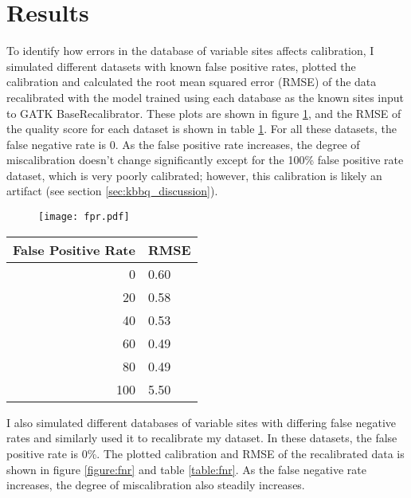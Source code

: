 \section{Results}
To identify how errors in the database of variable sites affects calibration, I simulated different datasets with known false positive rates, plotted the calibration and calculated the root mean squared error (RMSE) of the data recalibrated with the model trained using each database as the known sites input to GATK BaseRecalibrator. These plots are shown in figure \ref{figure:fpr}, and the RMSE of the quality score for each dataset is shown in table \ref{table:fpr}. For all these datasets, the false negative rate is 0. As the false positive rate increases, the degree of miscalibration doesn't change significantly except for the 100\% false positive rate dataset, which is very poorly calibrated; however, this calibration is likely an artifact (see section \ref{sec:kbbq_discussion}).

\begin{figure}
\centering
	\texttt{[image: fpr.pdf]}
	\label{figure:fpr}
\end{figure}

\begin{table}
\centering
\begin{tabular}{r l}
\toprule
False Positive Rate & RMSE \\
\midrule
0 & 0.60 \\
20 & 0.58 \\
40 & 0.53 \\
60 & 0.49 \\
80 & 0.49 \\
100 & 5.50 \\
\bottomrule
\end{tabular}
\label{table:fpr}
\end{table}

I also simulated different databases of variable sites with differing false negative rates and similarly used it to recalibrate my dataset. In these datasets, the false positive rate is 0\%. The plotted calibration and RMSE of the recalibrated data is shown in figure \ref{figure:fnr} and table \ref{table:fnr}. As the false negative rate increases, the degree of miscalibration also steadily increases.

